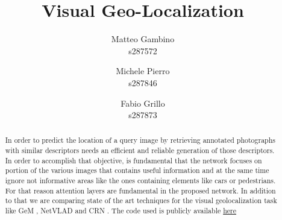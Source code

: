 \documentclass[10pt,twocolumn,letterpaper]{article}
\begin{document}
	
\title{Visual Geo-Localization}

\author{Matteo Gambino\\
	s287572
	\and
	Michele Pierro\\
	s287846
	\and
	Fabio Grillo\\
	s287873
}
\maketitle

\begin{abstract}
	In order to predict the location of a query image by retrieving annotated photographs with 
	similar descriptors needs an efficient and reliable generation of those descriptors. 
	In order to accomplish that objective, is fundamental that the network focuses on portion
	of the various images that contains useful information and at the same time ignore not 
	informative areas like the ones containing elements like cars or pedestrians. For that 
	reason attention layers are fundamental in the proposed network. In addition to that we 
	are comparing state of the art techniques for the visual geolocalization task like GeM \cite{GEM}, 
	NetVLAD \cite{NETVLAD} and CRN \cite{CRN}. The code used is publicly available 
	\href{https://github.com/matteo6198/project_visual_geolocalization}{here}
\end{abstract}

\end{document}
